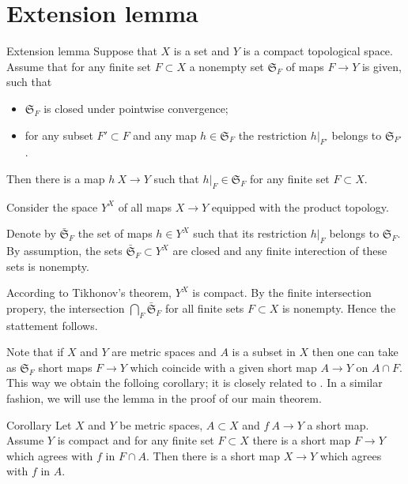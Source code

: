\section{Extension lemma}\label{Finite-whole extension lemma}

\begin{thm}{Extension lemma}\label{lem:finite-whole}
Suppose that $X$ is a set 
and $Y$ is a compact topological space.
Assume that for any finite set $F\subset X$ 
a nonempty set $\mathfrak{S}_F$ of maps  $F\to Y$ is given, such that
\begin{itemize}
\item $\mathfrak{S}_F$ is closed under pointwise convergence;
\item for any subset $F'\subset F$ and any map $h\in \mathfrak{S}_F$
the restriction $h|_{F'}$ belongs to $\mathfrak{S}_{F'}$. 
\end{itemize}

Then there is a map $h\: X\to Y$ such that $h|_F\in \mathfrak{S}_F$ for any finite set $F\subset X$.
\end{thm}

Consider the space $Y^X$ of all maps $X\to Y$ equipped with the product topology.

Denote by $\bar{\mathfrak{S}}_F$ the set of maps $h\in Y^X$ such that its restriction $h|_F$ belongs to $\mathfrak{S}_F$.
By assumption, the sets $\bar{\mathfrak{S}}_F\subset Y^X$ are closed and any finite interection of these sets is nonempty.

According to Tikhonov's theorem, $Y^X$ is compact.
By the finite intersection propery, the intersection $\bigcap_F\bar{\mathfrak{S}}_F$ for all finite sets $F\subset X$ is nonempty.
Hence the stattement follows.
\qeds

Note that if $X$ and $Y$ are metric spaces and $A$ is a subset in $X$
then one can take as $\mathfrak{S}_F$ short maps $F\to Y$ which coincide with a given short map $A\to Y$ on $A\cap F$.
This way we obtain the folloing corollary; it is closely related to \cite[Proposition 5.2]{lang-shroeder}.
In a similar fashion, we will use the lemma in the proof of our main theorem.

\begin{thm}{Corollary}
Let $X$ and $Y$ be metric spaces, $A\subset X$ and $f\:A\to Y$ a short map.
Assume $Y$ is compact and for any finite set $F\subset X$ there is a short map $F\to Y$ which agrees with $f$ in $F\cap A$.
Then there is a short map $X\to Y$ which agrees with $f$ in $A$.
\end{thm}